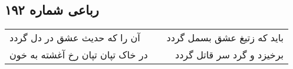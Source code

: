 \begin{center}
\section*{رباعی شماره ۱۹۲}
\label{sec:sh192}
\begin{longtable}{l p{0.5cm} r}
آن را که حدیث عشق در دل گردد
&&
باید که زتیغ عشق بسمل گردد
\\
در خاک تپان تپان رخ آغشته به خون
&&
برخیزد و گرد سر قاتل گردد
\\
\end{longtable}
\end{center}
